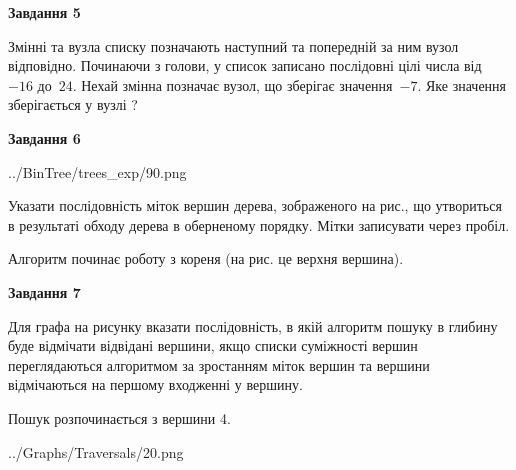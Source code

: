 \documentclass[12pt, ukrainian]{article}
\begin{document}
{\begin {large}
{\begin {center}\textbf{Завдання 5}\end {center}}\par
Змінні  та  вузла списку позначають наступний та попередній за ним вузол відповідно. Починаючи з голови, у список записано послідовні цілі числа від~$-16$ до~$24$. Нехай змінна  позначає вузол, що зберігає значення~$-7$.
Яке значення зберігається у вузлі  ?\par
\newpage

{\begin {center}\textbf{Завдання 6}\end {center}}\par

\begin{center}
	{../BinTree/trees_exp/90.png}
\end{center}
Указати послідовність міток вершин дерева, зображеного на рис., що утвориться в результаті обходу дерева в оберненому порядку. Мітки записувати через пробіл.\par Алгоритм починає роботу з кореня (на рис. це верхня вершина).\par
\newpage

{\begin {center}\textbf{Завдання 7}\end {center}}\par
Для графа на рисунку вказати послідовність, в якій алгоритм пошуку в глибину буде відмічати відвідані вершини, якщо списки суміжності вершин переглядаються алгоритмом за зростанням міток вершин та вершини відмічаються на першому вход\-женні у вершину.\par
Пошук розпочинається з вершини 4.\par

\begin{center}
	{../Graphs/Traversals/20.png}
\end{center}\par
\newpage


\end{large}}
\end{document}
